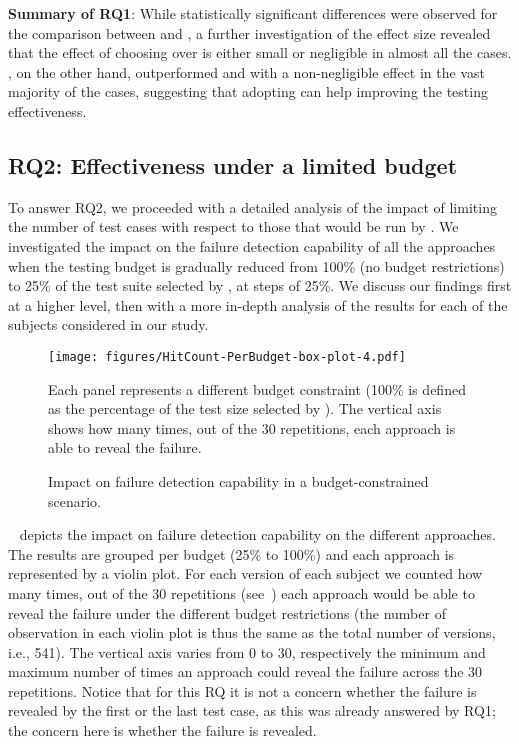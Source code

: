 \begin{tcolorbox}%
\textbf{Summary of RQ1}: While statistically significant differences were observed for the comparison between \ek and \fs, a further investigation of the effect size revealed that the effect of choosing \ek over \fs is either small or negligible in almost all the cases.
\fz, on the other hand, outperformed \ek and \fs with a non-negligible effect in the vast majority of the cases, suggesting that adopting \fz can help improving the testing effectiveness.
\end{tcolorbox}


\subsection{RQ2: Effectiveness under a limited budget}
\label{subsec:rq2}

To answer RQ2, we proceeded with a detailed analysis of the impact of limiting the number of test cases with respect to those that would be run by \ek. 
We investigated the impact on the failure detection capability of all the approaches 
when the testing budget is gradually reduced from 100\% (no budget restrictions) 
to 25\% of the test suite selected by \ek, at steps of 25\%.
%
We discuss our findings first at a higher level, then with a more in-depth analysis of the results for each of the subjects considered in our study.

\begin{figure*}[h]
  \centering
  \texttt{[image: figures/HitCount-PerBudget-box-plot-4.pdf]}
  \begin{flushleft}
	\footnotesize
	Each panel represents a different budget constraint (100\% is defined as the percentage of the test size selected by \ek).
	The vertical axis shows how many times, out of the 30 repetitions, each approach is able to reveal the failure.
  \end{flushleft}
  \caption{Impact on failure detection capability in a budget-constrained scenario.}
  \label{fig:perbudget}
\end{figure*}

~ depicts the impact on failure detection capability on the different approaches.
The results are grouped per budget 
(25\% to 100\%) 
and each approach is represented by a violin plot.
For each version of each subject 
we counted how many times, out of the 30 repetitions (see~)
each approach would be able to reveal the failure under the different budget restrictions 
(the number of observation in each violin plot is thus the same as the total number of versions, i.e., 541).
The vertical axis varies from 0 to 30, respectively the minimum and maximum number of times an approach could reveal the failure across the 30 repetitions.
Notice that for this RQ it is not a concern whether the failure is revealed by the first or the last test case, 
as this was already answered by RQ1; the  concern here is whether the failure is revealed.

